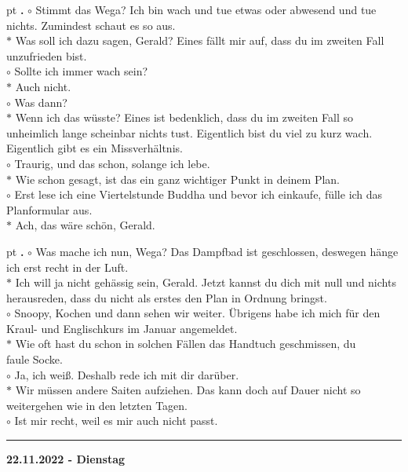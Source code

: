 \documentclass[10pt,a4paper]{article}
\newcounter{notec}
\newcommand\notep[1]{%
  \stepcounter{notec}
  \vskip #1pt
  {\bf\arabic{notec}.}
}
\newcommand\rele[1] {{\color {english} \bf {#1}}}              %
\newcommand\ddivide {\vskip -9pt \hrule \vskip 6pt}
\begin{document}
\begin{mdframed}[style=daystyle]
  \notep 4 $\circ$ Stimmt das Wega? Ich bin wach und tue etwas oder abwesend und
  tue nichts. Zumindest schaut es so aus. \\
  $\ast$ Was soll ich dazu sagen, Gerald? Eines fällt mir auf, dass du im
  zweiten Fall unzufrieden bist. \\
  $\circ$ Sollte ich immer wach sein? \\
  $\ast$ Auch nicht. \\
  $\circ$ Was dann? \\
  $\ast$ Wenn ich das wüsste? Eines ist bedenklich, dass du im zweiten Fall 
  so unheimlich lange scheinbar nichts tust. Eigentlich bist du viel zu kurz
  wach. Eigentlich gibt es ein Missverhältnis. \\
  $\circ$ Traurig, und das schon, solange ich lebe. \\
  $\ast$ Wie schon gesagt, ist das ein ganz wichtiger Punkt in deinem Plan. \\
  $\circ$ Erst lese ich eine Viertelstunde Buddha und bevor ich einkaufe, fülle
  ich das Planformular aus. \\
  $\ast$ Ach, das wäre schön, Gerald.


  \notep 4 $\circ$ Was mache ich nun, Wega? Das Dampfbad ist geschlossen,
  deswegen hänge ich erst recht in der Luft. \\
  $\ast$ Ich will ja nicht gehässig sein, Gerald. Jetzt kannst du dich mit null
  und nichts herausreden, dass du nicht als erstes den Plan in Ordnung bringst. \\
  $\circ$ Snoopy, Kochen und dann sehen wir weiter. Übrigens habe ich mich für den
  Kraul- und Englischkurs im Januar angemeldet. \\
  $\ast$ Wie oft hast du schon in solchen Fällen das Handtuch geschmissen, du \\
  faule Socke. \\
  $\circ$ Ja, ich weiß. Deshalb rede ich mit dir darüber. \\
  $\ast$ Wir müssen andere Saiten aufziehen. Das kann doch auf Dauer nicht so
  weitergehen wie in den letzten Tagen. \\
  $\circ$ Ist mir recht, weil es mir auch nicht passt.

\end{mdframed}


\ddivide
{\rele {22.11.2022 - Dienstag}}
\end{document}
